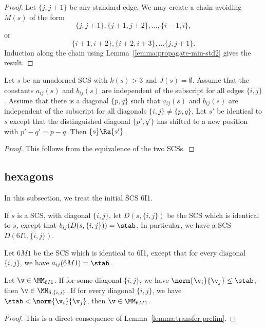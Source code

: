 \begin{proof}  Let $\{j,j+1\}$ be any standard edge.  We may create a chain avoiding $M(s)$ of the form
\[
\{j,j+1\}, \{j+1,j+2\},\ldots, \{i-1,i\},
\]
or 
\[
\{i+1,i+2\}, \{i+2,i+3\},\ldots \{j,j+1\}.
\]
Induction along the chain using Lemma~\ref{lemma:propagate-min-std2} gives the result.
\end{proof}

\begin{lemma}\label{lemma:equivalent-diagonal}
Let $s$ be an unadorned SCS with $k(s)>3$ and $J(s)=\emptyset$.  
Assume that the constants $a_{ij}(s)$ and $b_{ij}(s)$ are independent of
the subscript for all edges $\{i,j\}$.  Assume that there is a diagonal $\{p,q\}$ such that 
$a_{ij}(s)$ and $b_{ij}(s)$ are independent of the subscript for all diagonals $\{i,j\}\ne \{p,q\}$.
Let $s'$ be identical to $s$ except that the distinguished diagonal $\{p',q'\}$ has shifted
to a new position with $p' - q' = p - q$.  Then $\{s\}\Ra \{s'\}$.
\end{lemma}

\begin{proof}  This follows from the equivalence of the two SCSs.
\end{proof}

\subsection{hexagons}

In this subsection, we treat the initial SCS 6I1.

If $s$ is a SCS,
with  diagonal $\{i,j\}$, let $D(s,\{i,j\})$ be the SCS which is identical to $s$, except that
$b_{ij}(D(s,\{i,j\})) =\stab$.   In particular, we have a SCS $D(6I1,\{i,j\})$.

Let $6M1$ be the SCS which is identical to 6I1, except that for every
diagonal $\{i,j\}$, we have $a_{ij}(6M1) = \stab$.  

\begin{lemma}[] Let $\v\in \MM_{6I1}$.  If for some diagonal $\{i,j\}$, we have $\norm{\v_i}{\v_j}\le \stab$,
then $\v\in \MM_{6,\{i,j\}}$.  If for every diagonal $\{i,j\}$, we have $\stab < \norm{\v_i}{\v_j}$, then
$\v \in \MM_{6M1}$.
\end{lemma}

\begin{proof} This is a direct consequence of Lemma~\ref{lemma:transfer-prelim}.
\end{proof}

